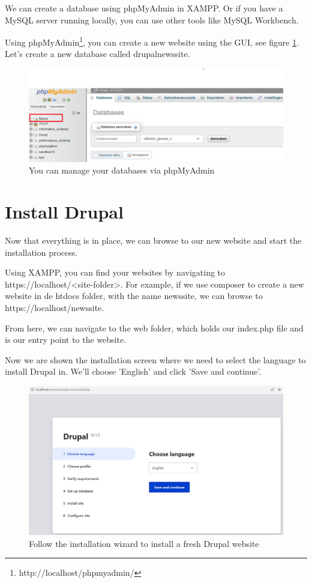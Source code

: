 We can create a database using phpMyAdmin in XAMPP. Or if you have a MySQL server running locally, you can use other tools like MySQL Workbench.

Using phpMyAdmin\footnote{http://localhost/phpmyadmin/}, you can create a new website using the GUI, see figure  \ref{fig:db_create}. Let's create a new database called drupal\textunderscore newssite.


\begin{figure}[h]
    \centering
    \includegraphics[width=1\linewidth]{img/ch3/createDB}
    \caption{You can manage your databases via phpMyAdmin}
    \label{fig:db_create}
\end{figure}

\section{Install Drupal}
Now that everything is in place, we can browse to our new website and start the installation process.

Using XAMPP, you can find your websites by navigating to https://localhost/<site-folder>. For example, if we use composer to create a new website in de htdocs folder, with the name newssite, we can browse to https://localhost/newssite.

From here, we can navigate to the web folder, which holds our index.php file and is our entry point to the website.

Now we are shown the installation screen where we need to select the language to install Drupal in. We'll choose 'English' and click 'Save and continue'.

\begin{figure}[h]
    \centering
    \includegraphics[width=1\linewidth]{img/ch3/install_step1}
    \caption{Follow the installation wizard to install a fresh Drupal website}
    \label{fig:install_step1}
\end{figure}

